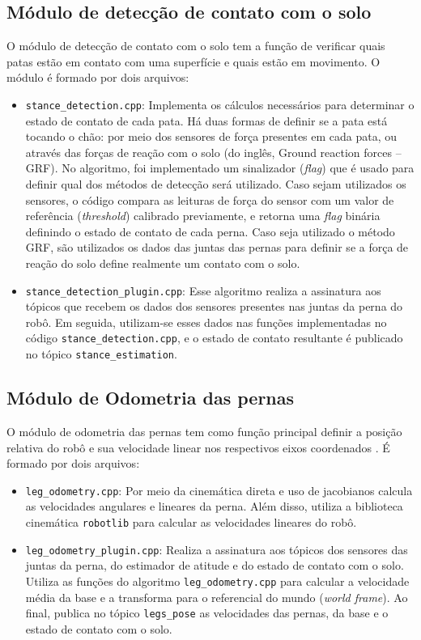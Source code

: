 \subsection{Módulo de detecção de contato com o solo}
O módulo de detecção de contato com o solo tem a função de verificar quais patas estão em contato com uma superfície e quais estão em movimento. O módulo é formado por dois arquivos:
\begin{itemize}
    \item \texttt{stance\_detection.cpp}: Implementa os cálculos necessários para determinar o estado de contato de cada pata. Há duas formas de definir se a pata está tocando o chão: por meio dos sensores de força presentes em cada pata, ou através das forças de reação com o solo (do inglês, Ground reaction forces -- GRF). No algoritmo, foi implementado um sinalizador (\textit{flag}) que é usado para definir qual dos métodos de detecção será utilizado. Caso sejam utilizados os sensores, o código compara as leituras de força do sensor com um valor de referência (\textit{threshold}) calibrado previamente, e retorna uma \textit{flag} binária definindo o estado de contato de cada perna. Caso seja utilizado o método GRF, são utilizados os dados das juntas das pernas para definir se a força de reação do solo define realmente um contato com o solo.
    \item \texttt{stance\_detection\_plugin.cpp}: Esse algoritmo realiza a assinatura aos tópicos que recebem os dados dos sensores presentes nas juntas da perna do robô. Em seguida, utilizam-se esses dados nas funções implementadas no código \texttt{stance\_detection.cpp}, e o estado de contato resultante é publicado no tópico \texttt{stance\_estimation}.
\end{itemize}

\subsection{Módulo de Odometria das pernas}

O módulo de odometria das pernas tem como função principal definir a posição relativa do robô e sua velocidade linear nos respectivos eixos coordenados \cite{nistico2025muse}. É formado por dois arquivos:
\begin{itemize}
    \item \texttt{leg\_odometry.cpp}: Por meio da cinemática direta e uso de jacobianos calcula as velocidades angulares e lineares da perna. Além disso, utiliza a biblioteca cinemática \texttt{robotlib} para calcular as velocidades lineares do robô.
    \item \texttt{leg\_odometry\_plugin.cpp}: Realiza a assinatura aos tópicos dos sensores das juntas da perna, do estimador de atitude e do estado de contato com o solo. Utiliza as funções do algoritmo \texttt{leg\_odometry.cpp} para calcular a velocidade média da base e a transforma para o referencial do mundo (\textit{world frame}). Ao final, publica no tópico \texttt{legs\_pose} as velocidades das pernas, da base e o estado de contato com o solo.
\end{itemize}

